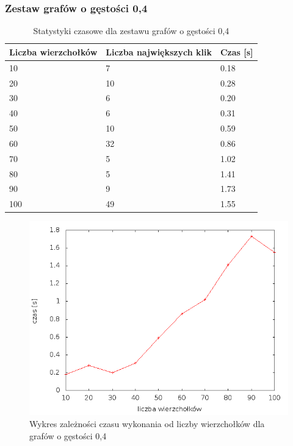 \documentclass[12pt, a4paper]{article}
\begin{document}
\subsubsection*{Zestaw grafów o gęstości 0,4}
\begin{table}[H]
\caption{Statystyki czasowe dla zestawu grafów o gęstości 0,4}
\begin{center}
    \begin{tabular}{|l|l|l|}
    \hline
    Liczba wierzchołków & Liczba największych klik & Czas [s] \\ \hline
    10 & 7 & 0.18 \\ \hline
    20 & 10 & 0.28 \\ \hline
    30 & 6 & 0.20 \\ \hline
    40 & 6 & 0.31 \\ \hline
    50 & 10 & 0.59 \\ \hline
    60 & 32 & 0.86 \\ \hline
    70 & 5 & 1.02 \\ \hline
    80 & 5 & 1.41 \\ \hline
    90 & 9 & 1.73 \\ \hline
    100 & 49 & 1.55 \\ \hline
    \end{tabular}
\end{center}
\end{table}

\begin{figure}[h]
    \begin{center}
	\includegraphics[scale=0.5]{../experiment_1/img/den/den_04.png}
	\caption{Wykres zależności czasu wykonania od liczby wierzchołków dla grafów o gęstości 0,4}
    \end{center}
\end{figure}
\end{document}

